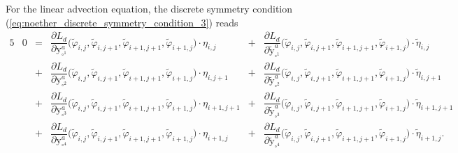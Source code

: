 \documentclass[12pt,a4paper,reqno]{article}
\begin{document}
For the linear advection equation, the discrete symmetry condition (\ref{eq:noether_discrete_symmetry_condition_3}) reads
\begingroup
\allowdisplaybreaks
\begin{alignat}{5}
\label{eq:linear_advection_discrete_symmetry_condition_1}
& 0
\nonumber
&=& \dfrac{\partial L_d}{\partial {\ensuremath{{\ensuremath{\mathrm{{y}}}}}}^{a}_{\square^1}} \Big( \tilde{\ensuremath{\varphi}}_{i,  j  }, \tilde{\ensuremath{\varphi}}_{i,  j+1}, \tilde{\ensuremath{\varphi}}_{i+1,j+1}, \tilde{\ensuremath{\varphi}}_{i+1,j  } \Big) \cdot \eta_{i,  j  }
&+& \dfrac{\partial L_d}{\partial \tilde{\ensuremath{{\ensuremath{\mathrm{{y}}}}}}^{a}_{\square^1}} \Big( \tilde{\ensuremath{\varphi}}_{i,  j  }, \tilde{\ensuremath{\varphi}}_{i,  j+1}, \tilde{\ensuremath{\varphi}}_{i+1,j+1}, \tilde{\ensuremath{\varphi}}_{i+1,j  } \Big) \cdot \tilde{\eta}_{i,  j  }
\\
\nonumber &
&+& \dfrac{\partial L_d}{\partial {\ensuremath{{\ensuremath{\mathrm{{y}}}}}}^{a}_{\square^2}} \Big( \tilde{\ensuremath{\varphi}}_{i,  j  }, \tilde{\ensuremath{\varphi}}_{i,  j+1}, \tilde{\ensuremath{\varphi}}_{i+1,j+1}, \tilde{\ensuremath{\varphi}}_{i+1,j  } \Big) \cdot \eta_{i,  j+1}
&+& \dfrac{\partial L_d}{\partial \tilde{\ensuremath{{\ensuremath{\mathrm{{y}}}}}}^{a}_{\square^2}} \Big( \tilde{\ensuremath{\varphi}}_{i,  j  }, \tilde{\ensuremath{\varphi}}_{i,  j+1}, \tilde{\ensuremath{\varphi}}_{i+1,j+1}, \tilde{\ensuremath{\varphi}}_{i+1,j  } \Big) \cdot \tilde{\eta}_{i,  j+1}
\\
\nonumber &
&+& \dfrac{\partial L_d}{\partial {\ensuremath{{\ensuremath{\mathrm{{y}}}}}}^{a}_{\square^3}} \Big( \tilde{\ensuremath{\varphi}}_{i,  j  }, \tilde{\ensuremath{\varphi}}_{i,  j+1}, \tilde{\ensuremath{\varphi}}_{i+1,j+1}, \tilde{\ensuremath{\varphi}}_{i+1,j  } \Big) \cdot \eta_{i+1,j+1}
&+& \dfrac{\partial L_d}{\partial \tilde{\ensuremath{{\ensuremath{\mathrm{{y}}}}}}^{a}_{\square^3}} \Big( \tilde{\ensuremath{\varphi}}_{i,  j  }, \tilde{\ensuremath{\varphi}}_{i,  j+1}, \tilde{\ensuremath{\varphi}}_{i+1,j+1}, \tilde{\ensuremath{\varphi}}_{i+1,j  } \Big) \cdot \tilde{\eta}_{i+1,j+1}
\\ &
&+& \dfrac{\partial L_d}{\partial {\ensuremath{{\ensuremath{\mathrm{{y}}}}}}^{a}_{\square^4}} \Big( \tilde{\ensuremath{\varphi}}_{i,  j  }, \tilde{\ensuremath{\varphi}}_{i,  j+1}, \tilde{\ensuremath{\varphi}}_{i+1,j+1}, \tilde{\ensuremath{\varphi}}_{i+1,j  } \Big) \cdot \eta_{i+1,j  }
&+& \dfrac{\partial L_d}{\partial \tilde{\ensuremath{{\ensuremath{\mathrm{{y}}}}}}^{a}_{\square^4}} \Big( \tilde{\ensuremath{\varphi}}_{i,  j  }, \tilde{\ensuremath{\varphi}}_{i,  j+1}, \tilde{\ensuremath{\varphi}}_{i+1,j+1}, \tilde{\ensuremath{\varphi}}_{i+1,j  } \Big) \cdot \tilde{\eta}_{i+1,j  }
.
\end{alignat}
\end{document}
